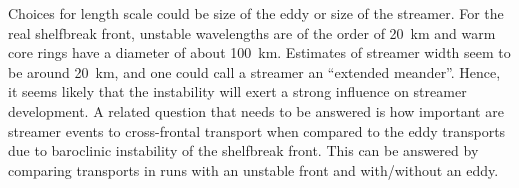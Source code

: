 Choices for length scale could be size of the eddy or size of the streamer. For the real shelfbreak front, unstable wavelengths are of the order of \SI{20}{\km} and warm core rings have a diameter of about \SI{100}{\km}. Estimates of streamer width seem to be around \SI{20}{\km}, and one could call a streamer an “extended meander”. Hence, it seems likely that the instability will exert a strong influence on streamer development. A related question that needs to be answered is how important are streamer events to cross-frontal transport when compared to the eddy transports due to baroclinic instability of the shelfbreak front. This can be answered by comparing transports in runs with an unstable front and with/without an eddy.


